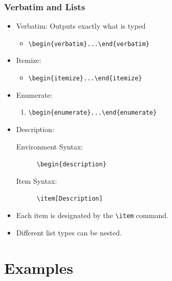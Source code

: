 \documentclass{beamer}
\begin{document}
\begin{frame}[containsverbatim]
    \frametitle{Verbatim and Lists}
    \begin{itemize}
        \item Verbatim: Outputs exactly what is typed
        \begin{itemize}
            \item \verb|\begin{verbatim}...\end{verbatim}|
        \end{itemize}
        \item Itemize:
        \begin{itemize}
            \item \verb|\begin{itemize}...\end{itemize}|
        \end{itemize}
        \item Enumerate:
        \begin{enumerate}
            \item \verb|\begin{enumerate}...\end{enumerate}|
        \end{enumerate}
        \item Description:
        \begin{description}
            \item[Environment Syntax:]  \verb|\begin{description}|
            \item[Item Syntax:] \verb|\item[Description]|
        \end{description}
        \item Each item is designated by the \verb|\item| command.
        \item Different list types can be nested.
    \end{itemize}
\end{frame}

\section{Examples}
\end{document}
